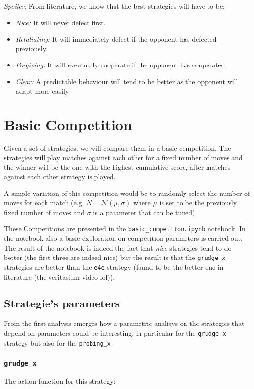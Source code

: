 \documentclass{article}
\begin{document}
\textit{Spoiler:} From literature, we know that the best strategies will have to be:
\begin{itemize}
    \item \textit{Nice:} It will never defect first.
    \item \textit{Retaliating:} It will immediately defect if the opponent has defected previously.
    \item \textit{Forgiving:} It will eventually cooperate if the opponent has cooperated.
    \item \textit{Clear:} A predictable behaviour will tend to be better as the opponent will adapt more easily.
\end{itemize}

\section{Basic Competition}
Given a set of strategies, we will compare them in a basic competition. The strategies will play matches against each other for a fixed number of moves and the winner will be the one with the highest cumulative score, after matches against each other strategy is played.

A simple variation of this competition would be to randomly select the number of moves for each match (e.g. $N = \mathcal{N}(\mu, \sigma)$ where $\mu$ is set to be the previously fixed number of moves and $\sigma$ is a parameter that can be tuned).

These Competitions are presented in the \texttt{basic\_competiton.ipynb} notebook. In the notebook also a basic exploration on competition parameters is carried out. The result of the notebook is indeed the fact that \textit{nice} strategies tend to do better (the first three are indeed nice) but the result is that the \texttt{grudge\_x} strategies are better than the \texttt{e4e} strategy (found to be the better one in literature (the veritasium video lol)). 

\subsection{Strategie's parameters}
From the first analysis emerges how a parametric analisys on the strategies that depend on parameters could be interesting, in particular for the \texttt{grudge\_x} strategy but also for the \texttt{probing\_x}

\subsubsection{\texttt{grudge\_x}}
The action function for this strategy: 
\end{document}

